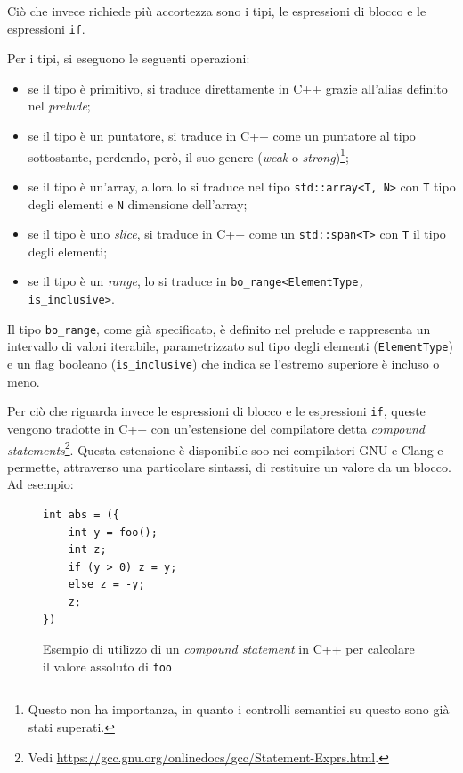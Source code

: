 Ci\`o che invece richiede pi\`u accortezza sono i tipi, le espressioni di blocco e le espressioni \texttt{if}.

Per i tipi, si eseguono le seguenti operazioni:
\begin{itemize}
	\item se il tipo \`e primitivo, si traduce direttamente in C++ grazie all'alias definito nel \textit{prelude};
	\item se il tipo \`e un puntatore, si traduce in C++ come un puntatore al tipo sottostante, perdendo, per\`o, il suo genere (\textit{weak} o \textit{strong})\footnote{Questo non ha importanza, in quanto i controlli semantici su questo sono gi\`a stati superati.};
	\item se il tipo \`e un'array, allora lo si traduce nel tipo \texttt{std::array<T, N>} con \texttt{T} tipo degli elementi e \texttt{N} dimensione dell'array;
	\item se il tipo \`e uno \textit{slice}, si traduce in C++ come un \texttt{std::span<T>} con \texttt{T} il tipo degli elementi;
	\item se il tipo \`e un \textit{range}, lo si traduce in \newline \texttt{bo\_range<ElementType, is\_inclusive>}.
\end{itemize}

Il tipo \texttt{bo\_range}, come gi\`a specificato, \`e definito nel prelude e rappresenta un intervallo di valori iterabile, parametrizzato sul tipo degli elementi (\texttt{ElementType}) e un flag booleano (\texttt{is\_inclusive}) che indica se l'estremo superiore \`e incluso o meno.

Per ci\`o che riguarda invece le espressioni di blocco e le espressioni \texttt{if}, queste vengono tradotte in C++ con un'estensione del compilatore detta \textit{compound statements}\footnote{Vedi \url{https://gcc.gnu.org/onlinedocs/gcc/Statement-Exprs.html}.}. Questa estensione \`e disponibile soo nei compilatori GNU e Clang e permette, attraverso una particolare sintassi, di restituire un valore da un blocco. Ad esempio:
\begin{figure}[H]
	\centering
	\begin{verbatim}
int abs = ({
    int y = foo();
    int z;
    if (y > 0) z = y;
    else z = -y;
    z;
})
	\end{verbatim}
	\label{fig:compound-statement-example}
	\caption{Esempio di utilizzo di un \textit{compound statement} in C++ per calcolare il valore assoluto di \texttt{foo}}
\end{figure}

